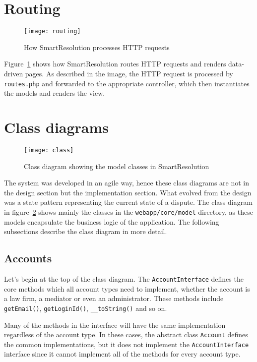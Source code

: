 \section{Routing}

\begin{figure}[h!]
  \centering
    \ifimages
    \texttt{[image: routing]}
    \fi
  \caption{How SmartResolution processes HTTP requests}
  \label{uml:routing}
\end{figure}

Figure~\ref{uml:routing} shows how SmartResolution routes HTTP requests and renders data-driven pages. As described in the image, the HTTP request is processed by \lstinline{routes.php} and forwarded to the appropriate controller, which then instantiates the models and renders the view.

\section{Class diagrams}

\begin{figure}[h!]
  \centering
    \ifimages
    \texttt{[image: class]}
    \fi
  \caption{Class diagram showing the model classes in SmartResolution}
  \label{uml:class}
\end{figure}

The system was developed in an agile way, hence these class diagrams are not in the design section but the implementation section. What evolved from the design was a state pattern representing the current state of a dispute. The class diagram in figure~\ref{uml:class} shows mainly the classes in the \lstinline{webapp/core/model} directory, as these models encapsulate the business logic of the application. The following subsections describe the class diagram in more detail.

\subsection{Accounts}

Let's begin at the top of the class diagram. The \lstinline{AccountInterface} defines the core methods which all account types need to implement, whether the account is a law firm, a mediator or even an administrator. These methods include \lstinline{getEmail()}, \lstinline{getLoginId()}, \lstinline{__toString()} and so on.

Many of the methods in the interface will have the same implementation regardless of the account type. In these cases, the abstract class \lstinline{Account} defines the common implementations, but it does not implement the \lstinline{AccountInterface} interface since it cannot implement all of the methods for every account type.

